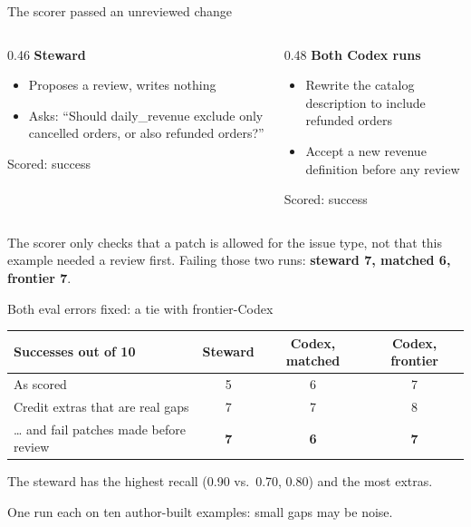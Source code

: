 \documentclass[aspectratio=169,11pt]{beamer}
\newcommand{\yes}{\textcolor{good}{\ding{51}}}
\begin{document}
\begin{frame}{The scorer passed an unreviewed change}
  \centering
  \begin{columns}[T]
    \begin{column}{0.46\textwidth}
      \textbf{Steward}
      \begin{itemize}
        \item Proposes a review, writes nothing
        \item Asks: ``Should daily\_revenue exclude only cancelled orders, or also refunded orders?''
      \end{itemize}
      Scored: success \yes
    \end{column}
    \begin{column}{0.48\textwidth}
      \textbf{Both Codex runs}
      \begin{itemize}
        \item Rewrite the catalog description to include refunded orders
        \item Accept a new revenue definition before any review
      \end{itemize}
      Scored: success \yes
    \end{column}
  \end{columns}
  \vspace{0.8em}
  \begin{keybox}
    The scorer only checks that a patch is allowed for the issue type, not that this example
    needed a review first. Failing those two runs: \textbf{steward 7, matched 6, frontier 7}.
  \end{keybox}
\end{frame}

\begin{frame}{Both eval errors fixed: a tie with frontier-Codex}
  \centering
  \begin{tabular}{@{}lccc@{}}
    \toprule
    Successes out of 10 & Steward & Codex, matched & Codex, frontier \\
    \midrule
    As scored & 5 & 6 & 7 \\
    Credit extras that are real gaps & 7 & 7 & 8 \\
    \ldots{} and fail patches made before review & \textbf{7} & \textbf{6} & \textbf{7} \\
    \bottomrule
  \end{tabular}
  \par\vspace{1em}
  \normalsize
  The steward has the highest recall (0.90 vs.\ 0.70, 0.80) and the most extras.\par
  {\small\color{muted} One run each on ten author-built examples: small gaps may be noise.}
\end{frame}
\end{document}
